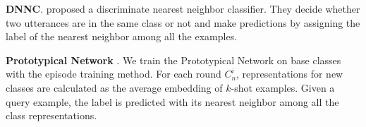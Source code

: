 \documentclass[11pt]{article}
\begin{document}

\textbullet\enspace \textbf{DNNC}.  proposed a discriminate nearest neighbor classifier. They decide whether two utterances are in the same class or not and make predictions by assigning the label of the nearest neighbor among all the examples.


\textbullet\enspace \textbf{Prototypical Network} \cite{DBLPSnellSZ17}. We train the Prototypical Network on base classes with the episode training method. For each round $C_n^i$, representations for new classes are calculated as the average embedding of $k$-shot examples. Given a query example, the label is predicted with its nearest neighbor among all the class representations.


\end{document}
